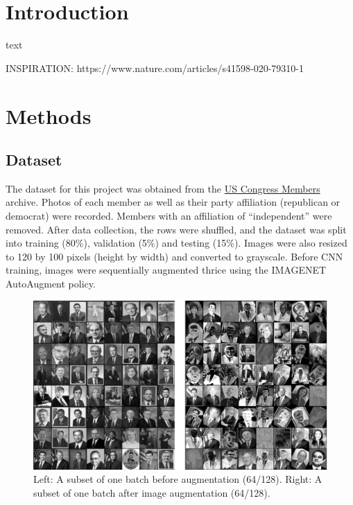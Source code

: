 \documentclass[manuscript,screen,review]{acmart}
\begin{document}

\maketitle

\section{Introduction}

text

INSPIRATION: https://www.nature.com/articles/s41598-020-79310-1 



\pagebreak
\section{Methods}

\subsection{Dataset}

The dataset for this project was obtained from the \href{https://www.congress.gov/members}{US Congress Members} archive. Photos of each member as well as their party affiliation (republican or democrat) were recorded. Members with an affiliation of ``independent'' were removed. After data collection, the rows were shuffled, and the dataset was split into training (80\%), validation (5\%) and testing (15\%). Images were also resized to 120 by 100 pixels (height by width) and converted to grayscale. Before CNN training, images were sequentially augmented thrice using the IMAGENET AutoAugment policy. 

\begin{figure}[h]
  \centering
  \includegraphics[width=\linewidth]{../presentation/batch_both.png}
  \caption{Left: A subset of one batch before augmentation (64/128). Right: A subset of one batch after image augmentation (64/128).}
  \label{fig:batch}
\end{figure}
\end{document}
